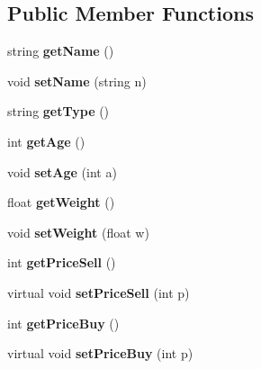 \subsection*{Public Member Functions}
\begin{DoxyCompactItemize}
\item 
\mbox{\label{class_animal_acd010252e10da84a05efd43d9bf69279}} 
string {\bfseries get\+Name} ()
\item 
\mbox{\label{class_animal_aa26d5b8f6912f03da2cc64ff0b888972}} 
void {\bfseries set\+Name} (string n)
\item 
\mbox{\label{class_animal_abd2ffd89b5ad2126ac2af7d31ca6d446}} 
string {\bfseries get\+Type} ()
\item 
\mbox{\label{class_animal_a4b3acac24e7995363c4f130887c3b3ab}} 
int {\bfseries get\+Age} ()
\item 
\mbox{\label{class_animal_a91a574efed96581f15ce99c62dba3778}} 
void {\bfseries set\+Age} (int a)
\item 
\mbox{\label{class_animal_a722be3bcb2f66289160b6932111caf32}} 
float {\bfseries get\+Weight} ()
\item 
\mbox{\label{class_animal_a79b8aaf14511a9624d35fb9e83959270}} 
void {\bfseries set\+Weight} (float w)
\item 
\mbox{\label{class_animal_ad5cee2c9d8bdfc27e3eea866f7ed6eea}} 
int {\bfseries get\+Price\+Sell} ()
\item 
\mbox{\label{class_animal_aee99154e40d8d538308f803a24bd8314}} 
virtual void {\bfseries set\+Price\+Sell} (int p)
\item 
\mbox{\label{class_animal_a0d329a7e10c3ab3af2f4e9048326c1e2}} 
int {\bfseries get\+Price\+Buy} ()
\item 
\mbox{\label{class_animal_a6ad26fc54e55d2a577bdb0673f9c6c7e}} 
virtual void {\bfseries set\+Price\+Buy} (int p)
\item 
\mbox{\label{class_animal_a39c25838a7b4dd87e67838cc6e78fae6}} 

\end{DoxyCompactItemize}
